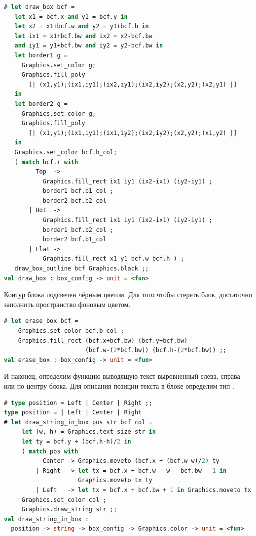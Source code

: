 \begin{lstlisting}[language=OCaml]
# let draw_box bcf = 
   let x1 = bcf.x and y1 = bcf.y in
   let x2 = x1+bcf.w and y2 = y1+bcf.h in 
   let ix1 = x1+bcf.bw and ix2 = x2-bcf.bw 
   and iy1 = y1+bcf.bw and iy2 = y2-bcf.bw in 
   let border1 g =
     Graphics.set_color g;
     Graphics.fill_poly 
       [| (x1,y1);(ix1,iy1);(ix2,iy1);(ix2,iy2);(x2,y2);(x2,y1) |] 
   in
   let border2 g = 
     Graphics.set_color g;
     Graphics.fill_poly 
       [| (x1,y1);(ix1,iy1);(ix1,iy2);(ix2,iy2);(x2,y2);(x1,y2) |]
   in
   Graphics.set_color bcf.b_col;
   ( match bcf.r with
         Top  -> 
           Graphics.fill_rect ix1 iy1 (ix2-ix1) (iy2-iy1) ;
           border1 bcf.b1_col ; 
           border2 bcf.b2_col
       | Bot  -> 
           Graphics.fill_rect ix1 iy1 (ix2-ix1) (iy2-iy1) ;
           border1 bcf.b2_col ; 
           border2 bcf.b1_col
       | Flat -> 
           Graphics.fill_rect x1 y1 bcf.w bcf.h ) ;
   draw_box_outline bcf Graphics.black ;;
val draw_box : box_config -> unit = <fun>
\end{lstlisting}

Контур блока подсвечен чёрным цветом. Для того чтобы стереть блок, достаточно 
заполнить пространство фоновым цветом.

\begin{lstlisting}[language=OCaml]
# let erase_box bcf = 
    Graphics.set_color bcf.b_col ; 
    Graphics.fill_rect (bcf.x+bcf.bw) (bcf.y+bcf.bw) 
                       (bcf.w-(2*bcf.bw)) (bcf.h-(2*bcf.bw)) ;;
val erase_box : box_config -> unit = <fun>
\end{lstlisting}

И наконец, определим функцию выводящую текст выровненный слева, справа или по 
центру блока. Для описания позиции текста в блоке определим тип .

\begin{lstlisting}[language=OCaml]
# type position = Left | Center | Right ;; 
type position = | Left | Center | Right
# let draw_string_in_box pos str bcf col = 
     let (w, h) = Graphics.text_size str in
     let ty = bcf.y + (bcf.h-h)/2 in 
     ( match pos with 
           Center -> Graphics.moveto (bcf.x + (bcf.w-w)/2) ty 
         | Right  -> let tx = bcf.x + bcf.w - w - bcf.bw - 1 in 
                     Graphics.moveto tx ty 
         | Left   -> let tx = bcf.x + bcf.bw + 1 in Graphics.moveto tx ty  ) ;
     Graphics.set_color col ;
     Graphics.draw_string str ;;
val draw_string_in_box :
  position -> string -> box_config -> Graphics.color -> unit = <fun>
\end{lstlisting}


